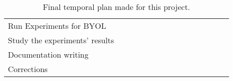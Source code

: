 \begin{table}[H]
{\begin{tabular}{lcccccc|ccccccll}
            \multicolumn{1}{l|}{Run Experiments for BYOL}        & \multicolumn{1}{l}{}                            & \multicolumn{1}{l}{}     & \multicolumn{1}{l}{}     & \multicolumn{1}{l}{}     & \multicolumn{1}{l}{}     & \multicolumn{1}{l|}{}    & \multicolumn{1}{l}{}     & \multicolumn{1}{l}{}                         & \multicolumn{1}{l}{}                         & \multicolumn{1}{l}{}                         & \multicolumn{1}{l}{}                         & \multicolumn{1}{l}{\cellcolor[HTML]{036400}} & \cellcolor[HTML]{036400} & \cellcolor[HTML]{036400} \\
            \multicolumn{1}{l|}{Study the experiments' results}  &                                                 &                          &                          &                          &                          &                          &                          &                                              &                                              &                                              &                                              & \cellcolor[HTML]{036400}                     & \cellcolor[HTML]{036400} & \cellcolor[HTML]{036400} \\
            \multicolumn{1}{l|}{Documentation writing}           &                                                 &                          &                          &                          &                          &                          &                          &                                              & \cellcolor[HTML]{036400}                     & \cellcolor[HTML]{036400}                     & \cellcolor[HTML]{036400}                     & \cellcolor[HTML]{036400}                     & \cellcolor[HTML]{036400} & \cellcolor[HTML]{036400} \\
            \multicolumn{1}{l|}{Corrections}                     &                                                 &                          &                          &                          &                          &                          &                          & \cellcolor[HTML]{036400}                     &                                              &                                              &                                              &                                              &                          & \cellcolor[HTML]{036400}
            \end{tabular}
    }
    \caption{Final temporal plan made for this project.}
    \label{table:temp:plan:2}
    \end{table}

